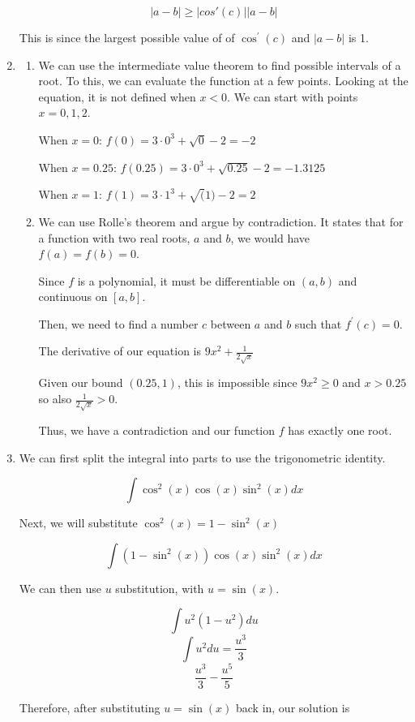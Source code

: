 \documentclass[11pt, letterpaper, twoside]{article}
\begin{document}
\begin{enumerate}
\[|a-b|\geq |cos\prime(c)||a-b|\]

This is since the largest possible value of of \(\cos^\prime(c)\) and \(|a-b|\) is 1.

\item %
\begin{enumerate}[label=\alph*)]
\item
We can use the intermediate value theorem to find possible intervals of a root. 
To this, we can evaluate the function at a few points. 
Looking at the equation, it is not defined when \(x<0\). 
We can start with points \(x=0, 1, 2\).

When \(x=0\): \(f(0)=3\cdot0^3+\sqrt{0}-2=-2\)

When \(x=0.25\): \(f(0.25)=3\cdot0^3+\sqrt{0.25}-2=-1.3125\)

When \(x=1\): \(f(1)=3\cdot1^3+\sqrt(1)-2=2\)

\item
We can use Rolle's theorem and argue by contradiction.
It states that for a function with two real roots, \(a\) and \(b\), we would have \(f(a)=f(b)=0\).

Since \(f\) is a polynomial, it must be differentiable on \((a, b)\) and continuous on \([a,b]\).

Then, we need to find a number \(c\) between \(a\) and \(b\) such that \(f^\prime(c)=0\).

The derivative of our equation is \(9x^2+\frac{1}{2\sqrt x}\)

Given our bound \((0.25, 1)\), this is impossible since \(9x^2\geq0\) and \(x>0.25\) so also \(\frac{1}{2\sqrt x}>0\).

Thus, we have a contradiction and our function \(f\) has exactly one root.

\end{enumerate}
\item %
We can first split the integral into parts to use the trigonometric identity.

\[\int \cos^2(x)\cos(x)\sin^2(x)dx\]

Next, we will substitute \(\cos^2(x)=1-\sin^2(x)\)

\[\int(1-\sin^2(x))\cos(x)\sin^2(x)dx\]

We can then use \(u\) substitution, with \(u=\sin(x)\). 

\[\int u^2(1-u^2)du\]
\[\int u^2du = \frac{u^3}{3}\]
\[\frac{u^3}{3}-\frac{u^5}{5}\]

Therefore, after substituting \(u=\sin(x)\) back in, our solution is 


\end{enumerate}
\end{document}

